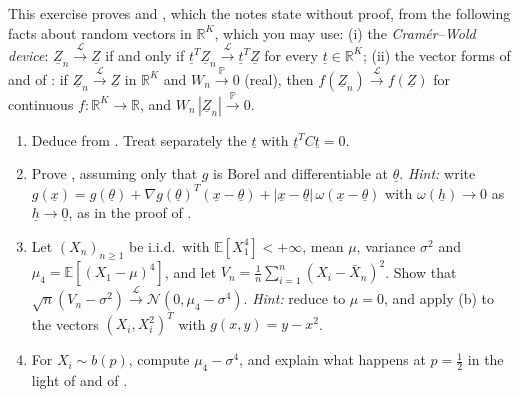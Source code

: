 \begin{exercise}\label{ex:ct-delta-vector}
\hard This exercise proves  and ,
which the notes state without proof, from the following facts about random vectors in
$\mathbb R^K$, which you may use: (i) the \emph{Cramér--Wold device}:
$\underline Z_n\xrightarrow{\mathcal L}\underline Z$ if and only if
$\underline t^T\underline Z_n\xrightarrow{\mathcal L}\underline t^T\underline Z$ for every
$\underline t\in\mathbb R^K$; (ii) the vector forms of  and of
: if $\underline Z_n\xrightarrow{\mathcal L}\underline Z$ in $\mathbb R^K$
and $W_n\xrightarrow{\mathbb P}0$ (real), then $f(\underline Z_n)\xrightarrow{\mathcal L}f(\underline Z)$
for continuous $f:\mathbb R^K\to\mathbb R$, and $W_n\,|\underline Z_n|\xrightarrow{\mathbb P}0$.
\begin{enumerate}[label=(\alph*)]
  \item Deduce  from . Treat separately the
    $\underline t$ with $\underline t^TC\underline t=0$.
  \item Prove , assuming only that $g$ is Borel and
    differentiable at $\underline\theta$. \emph{Hint:} write
    $g(\underline x)=g(\underline\theta)+\nabla g(\underline\theta)^T(\underline x-\underline\theta)
    +|\underline x-\underline\theta|\,\omega(\underline x-\underline\theta)$ with
    $\omega(\underline h)\to0$ as $\underline h\to\underline0$, as in the proof of
    .
  \item Let $(X_n)_{n\ge1}$ be i.i.d.\ with $\mathbb E[X_1^4]<+\infty$, mean $\mu$, variance
    $\sigma^2$ and $\mu_4=\mathbb E[(X_1-\mu)^4]$, and let
    $V_n=\frac1n\sum_{i=1}^n(X_i-\bar X_n)^2$. Show that
    $\sqrt n(V_n-\sigma^2)\xrightarrow{\mathcal L}\mathcal N(0,\mu_4-\sigma^4)$. \emph{Hint:} reduce
    to $\mu=0$, and apply (b) to the vectors $(X_i,X_i^2)^T$ with $g(x,y)=y-x^2$.
  \item For $X_i\sim b(p)$, compute $\mu_4-\sigma^4$, and explain what happens at $p=\frac12$ in the
    light of  and of .
\end{enumerate}
\end{exercise}

